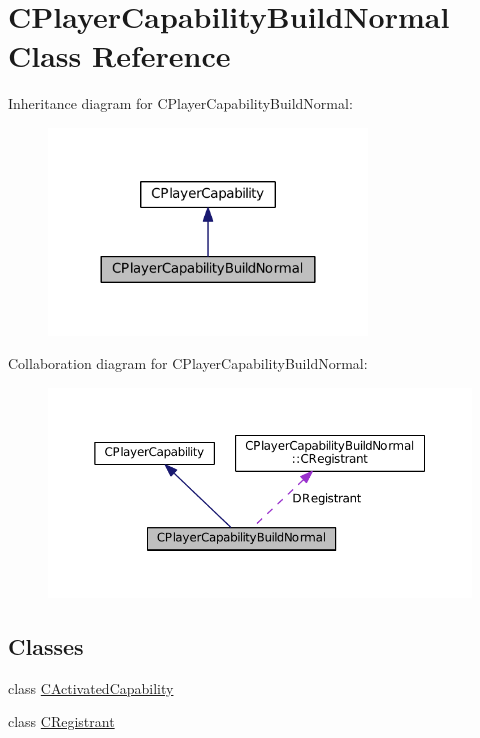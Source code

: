 \hypertarget{classCPlayerCapabilityBuildNormal}{}\section{C\+Player\+Capability\+Build\+Normal Class Reference}
\label{classCPlayerCapabilityBuildNormal}


Inheritance diagram for C\+Player\+Capability\+Build\+Normal\+:\nopagebreak
\begin{figure}[H]
\begin{center}
\leavevmode
\includegraphics[width=240pt]{classCPlayerCapabilityBuildNormal__inherit__graph}
\end{center}
\end{figure}


Collaboration diagram for C\+Player\+Capability\+Build\+Normal\+:\nopagebreak
\begin{figure}[H]
\begin{center}
\leavevmode
\includegraphics[width=350pt]{classCPlayerCapabilityBuildNormal__coll__graph}
\end{center}
\end{figure}
\subsection*{Classes}
\begin{DoxyCompactItemize}
\item 
class \hyperlink{classCPlayerCapabilityBuildNormal_1_1CActivatedCapability}{C\+Activated\+Capability}
\item 
class \hyperlink{classCPlayerCapabilityBuildNormal_1_1CRegistrant}{C\+Registrant}
\end{DoxyCompactItemize}
